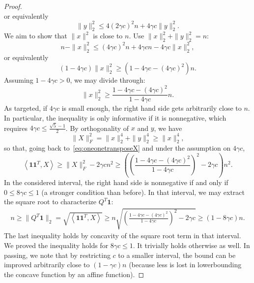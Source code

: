 \documentclass{colt2016} %
\newcommand{\inner}[2]{\left\langle{#1},{#2}\right\rangle}
\newcommand{\1}{\mathbf{1}}
\begin{document}
\begin{proof}
\[	\]
	or equivalently
	\[
	\|y\|_2^2 \leq 4(2\gamma c)^2 n + 4\gamma c \|y\|_2^2.
	\]
	We aim to show that $\|x\|^2$ is close to $n$. Use $\|x\|_2^2+\|y\|_2^2 = n$:
	\[
	n - \|x\|_2^2 \leq (4\gamma c)^2 n + 4\gamma c n - 4\gamma c \|x\|_2^2,
	\]
	or equivalently
	\[
	(1-4\gamma c) \|x\|_2^2 \geq \left(1 - 4\gamma c - (4\gamma c)^2\right)n.
	\]
	Assuming $1 - 4\gamma c > 0$, we may divide through:
	\[
	\|x\|_2^2 \geq \frac{1 - 4\gamma c - (4\gamma c)^2}{1-4\gamma c}n.
	\]
	As targeted, if $4\gamma c$ is small enough, the right hand side gets arbitrarily close to $n$. In particular, the inequality is only informative if it is nonnegative, which requires $4\gamma c \leq \frac{\sqrt{5}-1}{2}$. By orthogonality of $x$ and $y$, we have $$\|X\|_F^2 = \|x\|_2^4 + \|y\|_2^4 \geq \|x\|_2^4,$$ so that, going back to~\eqref{eq:oneonetransposeX} and under the assumption on $4\gamma c$,
	$$
	\inner{\1\1^T}{X} \geq \|X\|_F^2 - 2\gamma c n^2 \geq \left(\left(\frac{1 - 4\gamma c - (4\gamma c)^2}{1-4\gamma c}\right)^2 - 2\gamma c\right) n^2.
	$$
	In the considered interval, the right hand side is nonnegative if and only if $0 \leq 8\gamma c \leq 1$ (a stronger condition than before). In that interval, we may extract the square root to characterize $Q^T\1$:
	\begin{align*}
	n \geq \|Q^T\1\|_2 = \sqrt{\inner{\1\1^T}{X}} \geq n\sqrt{\left(\frac{1 - 4\gamma c - (4\gamma c)^2}{1-4\gamma c}\right)^2 - 2\gamma c} \geq (1-8\gamma c)n.
	\end{align*}
	The last inequality holds by concavity of the square root term in that interval. We proved the inequality holds for $8\gamma c \leq 1$. It trivially holds otherwise as well. In passing, we note that by restricting $c$ to a smaller interval, the bound can be improved arbitrarily close to $(1-\gamma c)n$ (because less is lost in lowerbounding the concave function by an affine function).

\end{proof}
\end{document}
